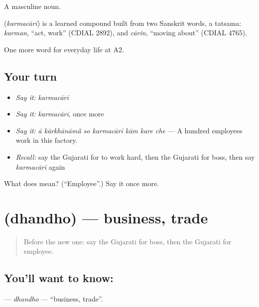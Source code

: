 A masculine noun.

\begin{cousinweb}
\textbf{} (\emph{karmacārī}) is a learned compound built from two Sanskrit words, a tatsama: \emph{karman}, \textquotedblleft{}act, work\textquotedblright{} (CDIAL 2892), and \emph{cārin}, \textquotedblleft{}moving about\textquotedblright{} (CDIAL 4765).
\end{cousinweb}

\begin{grammarlens}[title={What you've built}]
One more word for everyday life at A2.
\end{grammarlens}

\subsection*{Your turn}
\begin{itemize}
\raggedright
  \item \emph{Say it:} \emph{karmacārī}
  \item \emph{Say it:} \emph{karmacārī}, once more
  \item \emph{Say it:} \emph{ā kārkhānāmā̃ so karmacārī kām kare che} — A hundred employees work in this factory.
  \item \emph{Recall:} say the Gujarati for to work hard, then the Gujarati for boss, then say \emph{karmacārī} again
\end{itemize}

\begin{tcolorbox}[breakable,colback=teal!4,colframe=teal!35!black,title={Before you move on}]
What does  mean? (\textquotedblleft{}Employee\textquotedblright{}.) Say it once more.
\end{tcolorbox}
\section[\texorpdfstring{\gu{ધંધો} (dhandho)}{ધંધો (dhandho)}]{ (dhandho) — business, trade}

\label{lesson:GU-C247-dhandho}



\begin{quote}
Before the new one: say the Gujarati for boss, then the Gujarati for employee.
\end{quote}

\subsection*{You'll want to know: }
\textbf{} — \emph{dhandho} — \textquotedblleft{}business, trade\textquotedblright{}.

